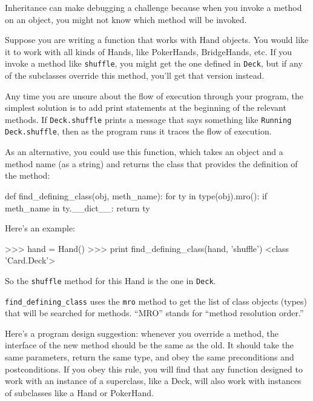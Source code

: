 Inheritance can make debugging a challenge because when you
invoke a method on an object, you might not know which method
will be invoked.


Suppose you are writing a function that works with Hand objects.
You would like it to work with all kinds of Hands, like
PokerHands, BridgeHands, etc.  If you invoke a method like
{\tt shuffle}, you might get the one defined in {\tt Deck},
but if any of the subclasses override this method, you'll
get that version instead.  


Any time you are unsure about the flow of execution through your
program, the simplest solution is to add print statements at the
beginning of the relevant methods.  If {\tt Deck.shuffle} prints a
message that says something like {\tt Running Deck.shuffle}, then as
the program runs it traces the flow of execution.

As an alternative, you could use this function, which takes an
object and a method name (as a string) and returns the class that
provides the definition of the method:

\beforeverb
\begin{pycode}
def find_defining_class(obj, meth_name):
    for ty in type(obj).mro():
        if meth_name in ty.__dict__:
            return ty
\end{pycode}
\afterverb
%
Here's an example:

\beforeverb
\begin{pyinterpreter}
>>> hand = Hand()
>>> print find_defining_class(hand, 'shuffle')
<class 'Card.Deck'>
\end{pyinterpreter}
\afterverb
%
So the {\tt shuffle} method for this Hand is the one in {\tt Deck}.


\verb"find_defining_class" uses the {\tt mro} method to get the list
of class objects (types) that will be searched for methods.  ``MRO''
stands for ``method resolution order.''


Here's a program design suggestion: whenever you override a method,
the interface of the new method should be the same as the old.  It
should take the same parameters, return the same type, and obey the
same preconditions and postconditions.  If you obey this rule, you
will find that any function designed to work with an instance of a
superclass, like a Deck, will also work with instances of subclasses
like a Hand or PokerHand.

